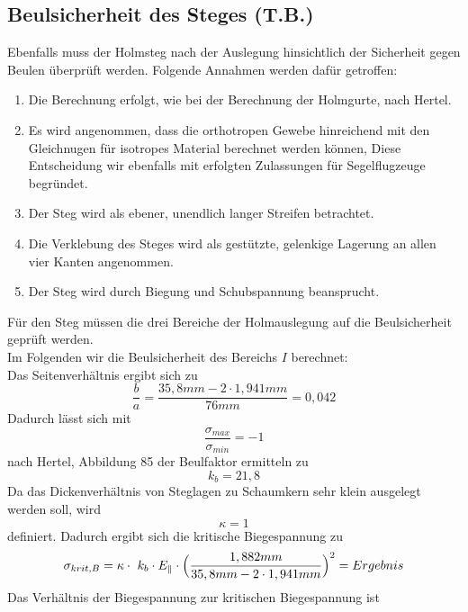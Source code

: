 \subsection{Beulsicherheit des Steges (T.B.)}
Ebenfalls muss der Holmsteg nach der Auslegung hinsichtlich der Sicherheit gegen Beulen überprüft werden. Folgende Annahmen werden dafür getroffen:\\
\begin{enumerate}
	\item Die Berechnung erfolgt, wie bei der Berechnung der Holmgurte, nach Hertel.
	\item Es wird angenommen, dass die orthotropen Gewebe hinreichend mit den Gleichnugen für isotropes Material berechnet werden können, Diese Entscheidung wir ebenfalls mit erfolgten Zulassungen für Segelflugzeuge begründet.
	\item Der Steg wird als ebener, unendlich langer Streifen betrachtet.
	\item Die Verklebung des Steges wird als gestützte, gelenkige Lagerung an allen vier Kanten angenommen.
	\item Der Steg wird durch Biegung und Schubspannung beansprucht.
\end{enumerate}
Für den Steg müssen die drei Bereiche der Holmauslegung auf die Beulsicherheit geprüft werden. \\
\noindent Im Folgenden wir die Beulsicherheit des Bereichs $I$ berechnet:\\
\noindent Das Seitenverhältnis ergibt sich zu 
\begin{equation}
	\frac{b}{a}=\frac{35,8 mm-2\cdot 1,941 mm}{76 mm}=0,042
\end{equation}
Dadurch lässt sich mit 
\begin{equation}
	\frac{\sigma_{max}}{\sigma_{min}}=-1
\end{equation}
nach Hertel, Abbildung 85 der Beulfaktor ermitteln zu
\begin{equation}
	k_{b} = 21,8
\end{equation}
Da das Dickenverhältnis von Steglagen zu Schaumkern sehr klein ausgelegt werden soll, wird
\begin{equation}
	\kappa = 1
\end{equation}
definiert. Dadurch ergibt sich die kritische Biegespannung zu
\begin{equation}
	\sigma_{krit,B}=\kappa\cdot\ k_{b}\cdot E_{\parallel}\cdot\Bigl(\frac{1,882 mm}{35,8 mm-2\cdot 1,941 mm}\Bigr)^{2}=Ergebnis
\end{equation}
Das Verhältnis der Biegespannung zur kritischen Biegespannung ist
